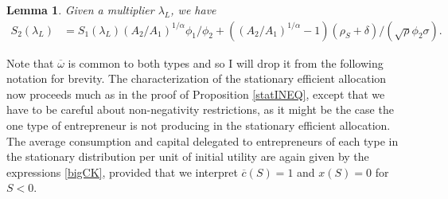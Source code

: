 \documentclass[11pt]{article}
\theoremstyle{plain}
\newtheorem{lemma}[thm]{Lemma}
\theoremstyle{definition} %
\begin{document}
\iffalse
\\ & = S_1(\lambda_L) (D_0\phi_1/\phi_2) + \frac{D_1 + (D_0 - 1)\rho_S}{\sqrt{\rho} \phi_2 \sigma} = S_1(\lambda_L) (A_2/A_1)^{1/\alpha}\phi_1/\phi_2 + ((A_2/A_1)^{1/\alpha}-1)\frac{\rho_S + \delta}{\sqrt{\rho} \phi_2 \sigma}
\fi

\begin{lemma}
Given a multiplier $\lambda_L$, we have 
\begin{equation}
\begin{aligned}
S_2(\lambda_L) & = S_1(\lambda_L) (A_2/A_1)^{1/\alpha}\phi_1/\phi_2 + ((A_2/A_1)^{1/\alpha}-1)(\rho_S + \delta)/(\sqrt{\rho} \phi_2 \sigma).
\label{S1S2}
\end{aligned}
\end{equation} %
\end{lemma} %

Note that $\overline{\omega}$ is common to both types and so I will drop it from the following notation for brevity. The characterization of the stationary efficient allocation now proceeds much as in the proof of Proposition \ref{statINEQ}, except that we have to be careful about non-negativity restrictions, as it might be the case the one type of entrepreneur is not producing in the stationary efficient allocation. The average consumption and capital delegated to entrepreneurs of each type in the stationary distribution per unit of initial utility are again given by the expressions \eqref{bigCK}, provided that we interpret $\overline{c}(S) = 1$ and $x(S) = 0$ for $S < 0$.
\end{document}
